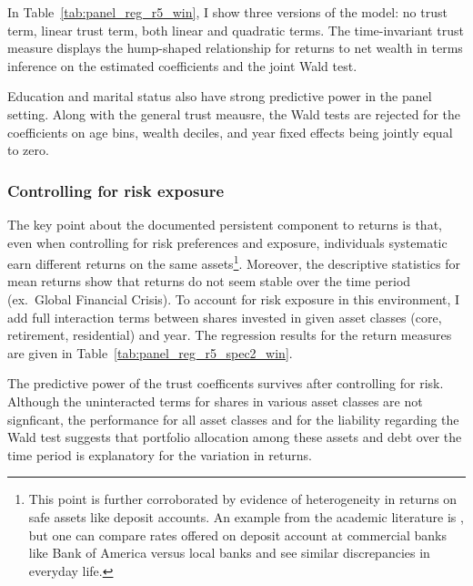 \par In Table~\ref{tab:panel_reg_r5_win}, I show three versions of the model: no trust term, linear trust term, both linear and quadratic terms. The time-invariant trust measure displays the hump-shaped relationship for returns to net wealth in terms inference on the estimated coefficients and the joint Wald test.

\label{tab:panel_reg_r5_win}
\FloatBarrier

\par Education and marital status also have strong predictive power in the panel setting. Along with the general trust meausre, the Wald tests are rejected for the coefficients on age bins, wealth deciles, and year fixed effects being jointly equal to zero. 

\subsubsection{Controlling for risk exposure}

\par The key point about the documented persistent component to returns is that, even when controlling for risk preferences and exposure, individuals systematic earn different returns on the same assets\footnote{This point is further corroborated by evidence of heterogeneity in returns on safe assets like deposit accounts. An example from the academic literature is \cite{Deuflhard14}, but one can compare rates offered on deposit account at commercial banks like Bank of America versus local banks and see similar discrepancies in everyday life.}. Moreover, the descriptive statistics for mean returns show that returns do not seem stable over the time period (ex.\ Global Financial Crisis). To account for risk exposure in this environment, I add full interaction terms between shares invested in given asset classes (core, retirement, residential) and year. The regression results for the return measures are given in Table~\ref{tab:panel_reg_r5_spec2_win}. 

\label{tab:panel_reg_r5_spec2_win}
\FloatBarrier

\par The predictive power of the trust coefficents survives after controlling for risk. Although the uninteracted terms for shares in various asset classes are not signficant, the performance for all asset classes and for the  liability regarding the Wald test suggests that portfolio allocation among these assets and debt over the time period is explanatory for the variation in returns.  

